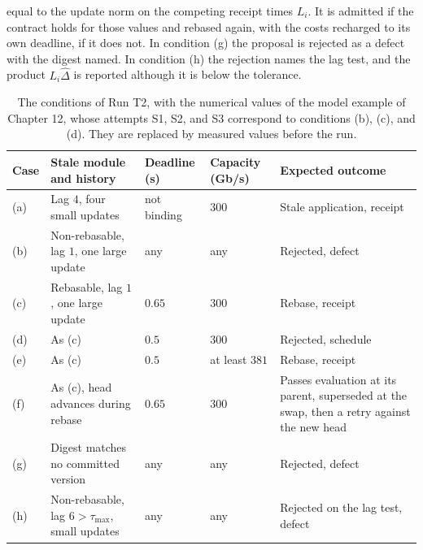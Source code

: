 \documentclass[11pt,openany]{book}
\theoremstyle{remark}
\begin{document}
equal to the update norm on the competing receipt times $L_i$. It is admitted if the contract holds for those values and rebased again, with the costs recharged to its own deadline, if it does not. In condition (g) the proposal is rejected as a defect with the digest named. In condition (h) the rejection names the lag test, and the product $L_i\hat\Delta$ is reported although it is below the tolerance.

\begin{table}[t]
\centering
\small
\begin{tabular}{@{}P{0.06\textwidth}P{0.37\textwidth}P{0.11\textwidth}P{0.11\textwidth}P{0.22\textwidth}@{}}
\toprule
Case & Stale module and history & Deadline (s) & Capacity (Gb/s) & Expected outcome \\
\midrule
(a) & Lag $4$, four small updates & not binding & $300$ & Stale application, receipt \\
(b) & Non-rebasable, lag $1$, one large update & any & any & Rejected, defect \\
(c) & Rebasable, lag $1$, one large update & $0.65$ & $300$ & Rebase, receipt \\
(d) & As (c) & $0.5$ & $300$ & Rejected, schedule \\
(e) & As (c) & $0.5$ & at least $381$ & Rebase, receipt \\
(f) & As (c), head advances during rebase & $0.65$ & $300$ & Passes evaluation at its parent, superseded at the swap, then a retry against the new head \\
(g) & Digest matches no committed version & any & any & Rejected, defect \\
(h) & Non-rebasable, lag $6>\tau_{\max}$, small updates & any & any & Rejected on the lag test, defect \\
\bottomrule
\end{tabular}
\caption{The conditions of Run T2, with the numerical values of the model example of Chapter 12, whose attempts S1, S2, and S3 correspond to conditions (b), (c), and (d). They are replaced by measured values before the run.}\label{tab:t2}
\end{table}
\end{document}
